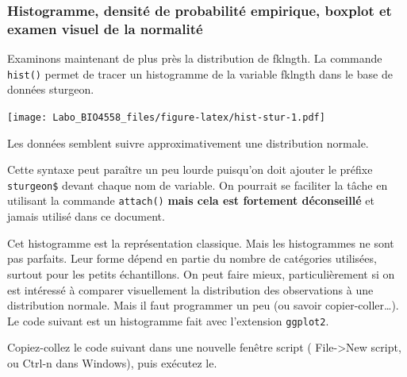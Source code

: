 \documentclass[12pt,]{book}
\makeatletter
\newenvironment{Shaded}{\begin{snugshade}}{\end{snugshade}}
\newcommand{\KeywordTok}[1]{\textcolor[rgb]{0.27,0.27,0.27}{\textbf{#1}}}
\newcommand{\NormalTok}[1]{#1}
\newcommand{\OperatorTok}[1]{\textcolor[rgb]{0.43,0.43,0.43}{\textbf{#1}}}
\newenvironment{kframe}{%
\medskip{}
\setlength{\fboxsep}{.8em}
 \def\at@end@of@kframe{}%
 \ifinner\ifhmode%
  \def\at@end@of@kframe{\end{minipage}}%
  \begin{minipage}{\columnwidth}%
 \fi\fi%
 \def\FrameCommand##1{\hskip\@totalleftmargin \hskip-\fboxsep
 \colorbox{shadecolor}{##1}\hskip-\fboxsep
     \hskip-\linewidth \hskip-\@totalleftmargin \hskip\columnwidth}%
 \MakeFramed {\advance\hsize-\width
   \@totalleftmargin\z@ \linewidth\hsize
   \@setminipage}}%
 {\par\unskip\endMakeFramed%
 \at@end@of@kframe}
\newenvironment{rmdblock}[1]
  {
  \begin{itemize}
  \renewcommand{\labelitemi}{
    \raisebox{-.7\height}[0pt][0pt]{
      {\setkeys{Gin}{width=3em,keepaspectratio}\texttt{[image: images/\#1]}}
    }
  }
  \setlength{\fboxsep}{1em}
  \begin{kframe}
  \item
  }
  {
  \end{kframe}
  \end{itemize}
  }
\newenvironment{rmdnote}
  {\begin{rmdblock}{note}}
  {\end{rmdblock}}
\newenvironment{rmdcode}
  {\begin{rmdblock}{screen}}
  {\end{rmdblock}}
\makeatother
\begin{document}
\hypertarget{histogramme-densituxe9-de-probabilituxe9-empirique-boxplot-et-examen-visuel-de-la-normalituxe9}{%
\subsubsection{Histogramme, densité de probabilité empirique, boxplot et examen visuel de la normalité}\label{histogramme-densituxe9-de-probabilituxe9-empirique-boxplot-et-examen-visuel-de-la-normalituxe9}}

Examinons maintenant de plus près la distribution de fklngth.
La commande \texttt{hist()} permet de tracer un histogramme de la variable fklngth dans le base de données sturgeon.

\begin{Shaded}
\end{Shaded}

\texttt{[image: Labo\_BIO4558\_files/figure-latex/hist-stur-1.pdf]}

Les données semblent suivre approximativement une distribution normale.

\begin{rmdnote}
Cette syntaxe peut paraître un peu lourde puisqu'on doit ajouter le préfixe \texttt{sturgeon\$} devant chaque nom de variable.
On pourrait se faciliter la tâche en utilisant la commande \texttt{attach()} \textbf{mais cela est fortement déconseillé} et jamais utilisé dans ce document.
\end{rmdnote}

Cet histogramme est la représentation classique.
Mais les histogrammes ne sont pas parfaits.
Leur forme dépend en partie du nombre de catégories utilisées, surtout pour les petits échantillons.
On peut faire mieux, particulièrement si on est intéressé à comparer visuellement la distribution des observations à une distribution normale.
Mais il faut programmer un peu (ou savoir copier-coller\ldots{}).
Le code suivant est un histogramme fait avec l'extension \texttt{ggplot2}.

\begin{rmdcode}
Copiez-collez le code suivant dans une nouvelle fenêtre script ( File-\textgreater{}New script, ou Ctrl-n dans Windows), puis exécutez le.
\end{rmdcode}
\end{document}
